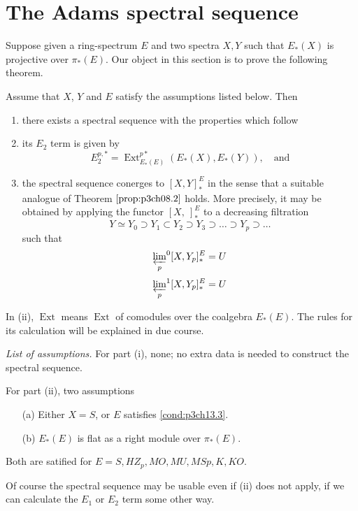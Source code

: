 \documentclass[../main]{subfiles}
\begin{document}
\chapter{The Adams spectral sequence}
\label{sec:p3c15}
Suppose given a ring-spectrum $E$ and two spectra $X,Y$ such that $E_\ast(X)$ is projective over $\pi_\ast(E)$. Our object in this section is to prove the following theorem. 

\begin{theorem}\label{thm:p3ch15.1}
Assume that $X$, $Y$ and $E$ satisfy the assumptions listed below. Then
\begin{enumerate}
    \item there exists a spectral sequence with the properties which follow
    \item its $E_2$ term is given by 
    $$E_2^{p,\ast}=\operatorname{Ext}_{E_\ast(E)}^{p\ast}(E_\ast(X),E_\ast(Y)), \quad \text{and}$$
    \item the spectral sequence conerges to $[X,Y]_\ast^E$ in the sense that a suitable analogue of Theorem $\ref{prop:p3ch08.2}$ holds. More precisely, it may be obtained by applying the functor $[X,~ ]_\ast^E$ to a decreasing filtration
    $$Y\simeq Y_0\supset Y_1\subset Y_2\supset Y_3 \supset \hdots \supset Y_p\supset \hdots$$
    such that 
    $${\varprojlim_p}^0[X,Y_p]_\ast^E=U$$
    $${\varprojlim_p}^1[X,Y_p]_\ast^E=U$$
\end{enumerate}
\end{theorem}
\begin{notes}
In (ii), $\operatorname{Ext}$ means $\operatorname{Ext}$ of comodules over the coalgebra $E_\ast(E)$. The rules for its calculation will be explained in due course.
\end{notes}
\par \emph{List of assumptions.} For part (i), none; no extra data is needed to construct the spectral sequence.

For part (ii), two assumptions
\begin{enumerate}
    \item[(a)] Either $X=S$, or $E$ satisfies \ref{cond:p3ch13.3}.
    \item[(b)] $E_\ast(E)$ is flat as a right module over $\pi_\ast(E)$.
\end{enumerate}
Both are satified for $E=S, HZ_p, MO, MU, MSp, K, KO$.

Of course the spectral sequence may be usable even if (ii) does not apply, if we can calculate the $E_1$ or $E_2$ term some other way.
\end{document}
